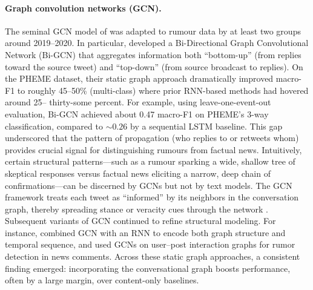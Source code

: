\documentclass{cshonours}
\begin{document}
\paragraph{Graph convolution networks (GCN).} The seminal GCN model of \cite{kipf2017semi} was adapted to rumour data by at least two groups around 2019–2020. In particular, \cite{bian2020rumor} developed a Bi-Directional Graph Convolutional Network (Bi-GCN) that aggregates information both “bottom-up” (from replies toward the source tweet) and “top-down” (from source broadcast to replies). On the PHEME dataset, their static graph approach dramatically improved macro-F1 to roughly 45–50\% (multi-class) where prior RNN-based methods had hovered around 25– thirty-some percent. For example, using leave-one-event-out evaluation, Bi-GCN achieved about 0.47 macro-F1 on PHEME’s 3-way classification, compared to \(\sim0.26\) by a sequential LSTM baseline. This gap underscored that the pattern of propagation (who replies to or retweets whom) provides crucial signal for distinguishing rumours from factual news. Intuitively, certain structural patterns—such as a rumour sparking a wide, shallow tree of skeptical responses versus factual news eliciting a narrow, deep chain of confirmations—can be discerned by GCNs but not by text models. The GCN framework treats each tweet as “informed” by its neighbors in the conversation graph, thereby spreading stance or veracity cues through the network \cite{rosa2019hierarchical}. Subsequent variants of GCN continued to refine structural modeling. For instance, \cite{wei2019gcnrnn} combined GCN with an RNN to encode both graph structure and temporal sequence, and \cite{wang2020satire} used GCNs on user–post interaction graphs for rumor detection in news comments. Across these static graph approaches, a consistent finding emerged: incorporating the conversational graph boosts performance, often by a large margin, over content-only baselines.
\end{document}
